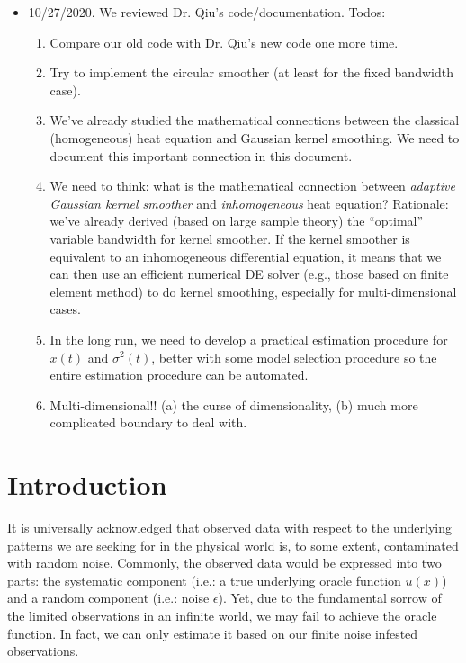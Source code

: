 \documentclass{article}
\begin{document}
\begin{itemize}
\item 10/27/2020. We reviewed Dr. Qiu's code/documentation. Todos:
  \begin{enumerate}
  \item Compare our old code with Dr. Qiu's new code one more time.
  \item Try to implement the circular smoother (at least for the fixed bandwidth case).
  \item We've already studied the mathematical connections between the classical (homogeneous) heat equation and Gaussian kernel smoothing. We need to document this important connection in this document.
  \item We need to think: what is the mathematical connection between \emph{adaptive Gaussian kernel smoother} and \emph{inhomogeneous} heat equation?  Rationale: we've already derived (based on large sample theory) the ``optimal'' variable bandwidth for kernel smoother. If the kernel smoother is equivalent to an inhomogeneous differential equation, it means that we can then use an efficient numerical DE solver (e.g., those based on finite element method) to do kernel smoothing, especially for multi-dimensional cases.
  \item In the long run, we need to develop a practical estimation procedure for $x(t)$ and $\sigma^{2}(t)$, better with some model selection procedure so the entire estimation procedure can be automated.
  \item Multi-dimensional!! (a) the curse of dimensionality, (b) much more complicated boundary to deal with.
  \end{enumerate}
\end{itemize}


\section{Introduction}
 
It is universally acknowledged that observed data with respect to the underlying patterns we are seeking for in the physical world is, to some extent, contaminated with random noise. Commonly, the observed data would be expressed into two parts: the systematic component (i.e.: a true underlying oracle function $u(x)$) and a random component (i.e.: noise $\epsilon$). Yet, due to the fundamental sorrow of the limited observations in an infinite world, we may fail to achieve the oracle function. In fact, we can only estimate it based on our finite noise infested observations. 
\end{document}
